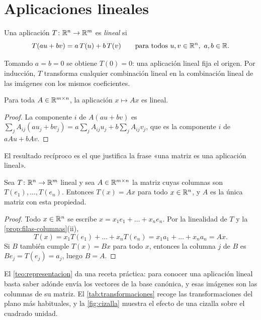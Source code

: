 \section{Aplicaciones lineales}

\begin{definicion}\label{def:lineal}
Una aplicación $T\colon\mathbb{R}^{n}\to\mathbb{R}^{m}$ es \emph{lineal} si
\[
T(au+bv)=a\,T(u)+b\,T(v)\qquad\text{para todos } u,v\in\mathbb{R}^{n},\ a,b\in\mathbb{R}.
\]
\end{definicion}

Tomando $a=b=0$ se obtiene $T(0)=0$: una aplicación lineal fija el origen. Por inducción, $T$ transforma cualquier combinación lineal en la combinación lineal de las imágenes con los mismos coeficientes.

\begin{proposicion}\label{prop:matriz-lineal}
Para toda $A\in\mathbb{R}^{m\times n}$, la aplicación $x\mapsto Ax$ es lineal.
\end{proposicion}

\begin{proof}
La componente $i$ de $A(au+bv)$ es $\sum_jA_{ij}(au_j+bv_j)=a\sum_jA_{ij}u_j+b\sum_jA_{ij}v_j$, que es la componente $i$ de $aAu+bAv$.
\end{proof}

El resultado recíproco es el que justifica la frase «una matriz es una aplicación lineal».

\begin{teorema}\label{teo:representacion}
Sea $T\colon\mathbb{R}^{n}\to\mathbb{R}^{m}$ lineal y sea $A\in\mathbb{R}^{m\times n}$ la matriz cuyas columnas son $T(e_1),\dots,T(e_n)$. Entonces $T(x)=Ax$ para todo $x\in\mathbb{R}^{n}$, y $A$ es la única matriz con esta propiedad.
\end{teorema}

\begin{proof}
Todo $x\in\mathbb{R}^{n}$ se escribe $x=x_1e_1+\dots+x_ne_n$. Por la linealidad de $T$ y la \cref{prop:filas-columnas}(ii),
\[
T(x)=x_1T(e_1)+\dots+x_nT(e_n)=x_1a_1+\dots+x_na_n=Ax.
\]
Si $B$ también cumple $T(x)=Bx$ para todo $x$, entonces la columna $j$ de $B$ es $Be_j=T(e_j)=a_j$, luego $B=A$.
\end{proof}

El \cref{teo:representacion} da una receta práctica: para conocer una aplicación lineal basta saber adónde envía los vectores de la base canónica, y esas imágenes son las columnas de su matriz. El \cref{tab:transformaciones} recoge las transformaciones del plano más habituales, y la \cref{fig:cizalla} muestra el efecto de una cizalla sobre el cuadrado unidad.

